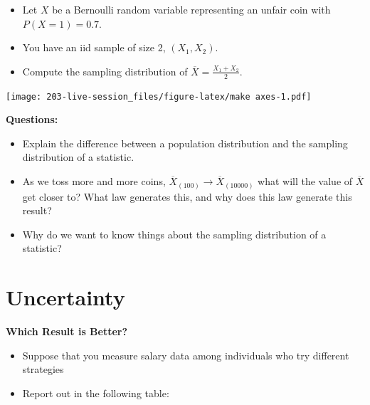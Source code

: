 \documentclass[
]{book}
\providecommand{\tightlist}{%
  \setlength{\itemsep}{0pt}\setlength{\parskip}{0pt}}
\theoremstyle{definition}
\theoremstyle{definition}
\theoremstyle{definition}
\theoremstyle{definition}
\theoremstyle{remark}
\begin{document}
\begin{itemize}
\tightlist
\item
  Let \(X\) be a Bernoulli random variable representing an unfair coin with \(P(X=1) = 0.7\).
\item
  You have an iid sample of size 2, \((X_1,X_2)\).
\item
  Compute the sampling distribution of \(\overline X = \frac{X_1+X_2}{2}\).
\end{itemize}

\texttt{[image: 203-live-session\_files/figure-latex/make axes-1.pdf]}

\textbf{Questions:}

\begin{itemize}
\tightlist
\item
  Explain the difference between a population distribution and the sampling distribution of a statistic.
\item
  As we toss more and more coins, \(\overline X_{(100)} \rightarrow \overline X_{(10000)}\) what will the value of \(\overline X\) get closer to? What law generates this, and why does this law generate this result?
\item
  Why do we want to know things about the sampling distribution of a statistic?
\end{itemize}

\hypertarget{uncertainty}{%
\section{Uncertainty}\label{uncertainty}}

\textbf{Which Result is Better?}

\begin{itemize}
\tightlist
\item
  Suppose that you measure salary data among individuals who try different strategies
\item
  Report out in the following table:
\end{itemize}
\end{document}
